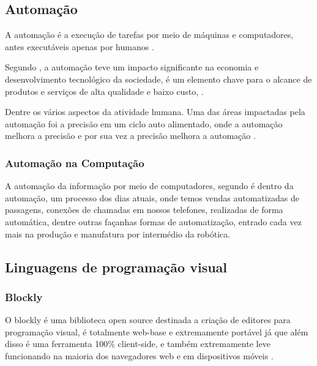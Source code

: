 \documentclass[12pt]{article}
\begin{document}


	\subsection{Automação}
	A automação é a execução de tarefas por meio de máquinas e computadores, antes executáveis apenas por humanos \cite{automationlevels}.
	
	
	Segundo \citeauthor{automation2009} \cite[pág. 124]{automation2009}, a automação teve um impacto significante na economia e desenvolvimento tecnológico da sociedade, é um elemento chave para o alcance de produtos e serviços de alta qualidade e baixo custo, .
	
	Dentre os vários aspectos da atividade humana. Uma das áreas impactadas pela automação foi a precisão em um ciclo auto alimentado, onde a automação melhora a precisão e por sua vez a precisão melhora a automação \cite{auto2008precision}.
	
	
	\subsubsection{Automação na Computação}
	
	A automação da informação por meio de computadores, segundo \citeauthor{automation2009} \cite[pág. 3]{automation2009} é dentro da automação, um processo dos dias atuais, onde temos vendas automatizadas de passagens, conexões de chamadas em nossos telefones, realizadas de forma automática, dentre outras façanhas formas de automatização, entrado cada vez mais na produção e manufatura por intermédio da robótica. 


	\subsection{Linguagens de programação visual}
	
	\subsubsection{Blockly}
	
	O blockly é uma biblioteca open source destinada a criação de editores para programação visual, é totalmente web-base e extremamente portável já que além disso é uma ferramenta 100\% client-side, e também extremamente leve funcionando na maioria dos navegadores web e em dispositivos móveis \cite{Blockly}.
	
\end{document}
